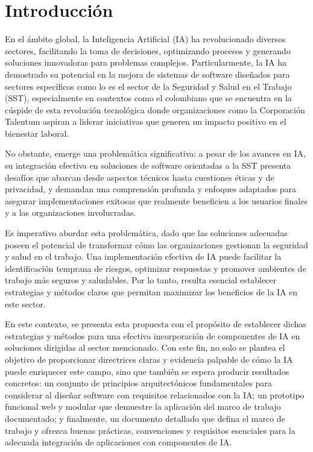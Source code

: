 \section{Introducción}

En el ámbito global, la Inteligencia Artificial (IA) ha revolucionado diversos sectores, facilitando la toma de decisiones, optimizando procesos y generando soluciones innovadoras para problemas complejos. Particularmente, la IA ha demostrado su potencial en la mejora de sistemas de software diseñados para sectores específicos como lo es el sector de la Seguridad y Salud en el Trabajo (SST), especialmente en contextos como el colombiano que se encuentra en la cúspide de esta revolución tecnológica donde organizaciones como la Corporación Talentum aspiran a liderar iniciativas que generen un impacto positivo en el bienestar laboral.

No obstante, emerge una problemática significativa: a pesar de los avances en IA, su integración efectiva en soluciones de software orientadas a la SST presenta desafíos que abarcan desde aspectos técnicos hasta cuestiones éticas y de privacidad, y demandan una comprensión profunda y enfoques adaptados para asegurar implementaciones exitosas que realmente beneficien a los usuarios finales y a las organizaciones involucradas.

Es imperativo abordar esta problemática, dado que las soluciones adecuadas poseen el potencial de transformar cómo las organizaciones gestionan la seguridad y salud en el trabajo. Una implementación efectiva de IA puede facilitar la identificación temprana de riesgos, optimizar respuestas y promover ambientes de trabajo más seguros y saludables. Por lo tanto, resulta esencial establecer estrategias y métodos claros que permitan maximizar los beneficios de la IA en este sector.

En este contexto, se presenta esta propuesta con el propósito de establecer dichas estrategias y métodos para una efectiva incorporación de componentes de IA en soluciones dirigidas al sector mencionado. Con este fin, no solo se plantea el objetivo de proporcionar directrices claras y evidencia palpable de cómo la IA puede enriquecer este campo, sino que también se espera producir resultados concretos: un conjunto de principios arquitectónicos fundamentales para considerar al diseñar software con requisitos relacionados con la IA; un prototipo funcional web y modular que demuestre la aplicación del marco de trabajo documentado; y finalmente, un documento detallado que defina el marco de trabajo y ofrezca buenas prácticas, convenciones y requisitos esenciales para la adecuada integración de aplicaciones con componentes de IA.

